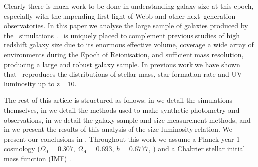 Clearly there is much work to be done in understanding galaxy size at this epoch, especially with the impending first light of Webb and other next--generation observatories. In this paper we analyse the large sample of galaxies produced by the \flares\ simulations \citep{Lovell2021, Vijayan2020}. \flares\ is uniquely placed to complement previous studies of high redshift galaxy size due to its enormous effective volume, coverage a wide array of environments during the Epoch of Reionisation, and sufficient mass resolution, producing a large and robust galaxy sample. In previous work we have shown that \flares\ reproduces the distributions of stellar mass, star formation rate and UV luminosity up to z ~ 10.

The rest of this article is structured as follows: in  we detail the simulations themselves, in  we detail the methods used to make synthetic photometry and observations, in  we detail the galaxy sample and size measurement methods, and in  we present the results of this analysis of the size-luminosity relation. We present our conclusions in . Throughout this work we assume a Planck year 1 cosmology ($\Omega_{0} = 0.307$, $\Omega_\Lambda = 0.693$, $h = 0.6777$, \cite{planck_collaboration_2014}) and a Chabrier stellar initial mass
function (IMF) \citep{chabrier_galactic_2003}.

